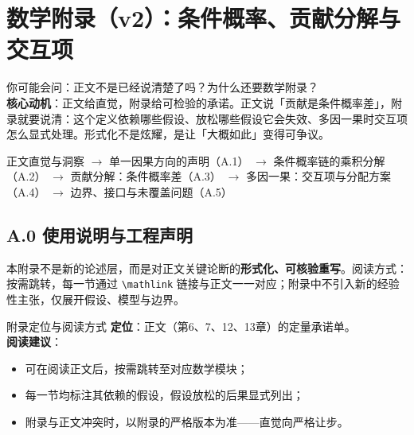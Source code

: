 \documentclass[../../main2.tex]{subfiles}
\begin{document}

	\chapter{数学附录（v2）：条件概率、贡献分解与交互项}
	\label{app:v2math}

	\begin{motivation}
		你可能会问：正文不是已经说清楚了吗？为什么还要数学附录？\\
		\textbf{核心动机}：正文给直觉，附录给可检验的承诺。正文说「贡献是条件概率差」，附录就要说清：这个定义依赖哪些假设、放松哪些假设它会失效、多因一果时交互项怎么显式处理。形式化不是炫耀，是让「大概如此」变得可争议。
	\end{motivation}

	\begin{logicmap}
	正文直觉与洞察
	$\rightarrow$ 单一因果方向的声明（A.1）
	$\rightarrow$ 条件概率链的乘积分解（A.2）
	$\rightarrow$ 贡献分解：条件概率差（A.3）
	$\rightarrow$ 多因一果：交互项与分配方案（A.4）
	$\rightarrow$ 边界、接口与未覆盖问题（A.5）
	\end{logicmap}

	\section{A.0 使用说明与工程声明}

	本附录不是新的论述层，而是对正文关键论断的\textbf{形式化、可核验重写}。阅读方式：按需跳转，每一节通过 \texttt{\textbackslash mathlink} 链接与正文一一对应；附录中不引入新的经验性主张，仅展开假设、模型与边界。

	\begin{mathbox}{附录定位与阅读方式}
		\textbf{定位}：正文（第6、7、12、13章）的定量承诺单。\\[0.4em]
		\textbf{阅读建议}：
		\begin{itemize}
			\item 可在阅读正文后，按需跳转至对应数学模块；
			\item 每一节均标注其依赖的假设，假设放松的后果显式列出；
			\item 附录与正文冲突时，以附录的严格版本为准——直觉向严格让步。
		\end{itemize}
	\end{mathbox}
\end{document}
